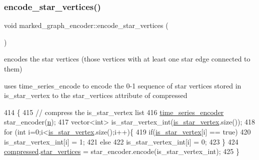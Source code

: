 \mbox{\label{classmarked__graph__encoder_af8daeed1452dbfd41fa2f875813e3496}} 
\subsubsection{\texorpdfstring{encode\+\_\+star\+\_\+vertices()}{encode\_star\_vertices()}}
{\footnotesize\ttfamily void marked\+\_\+graph\+\_\+encoder\+::encode\+\_\+star\+\_\+vertices (\begin{DoxyParamCaption}{ }\end{DoxyParamCaption})\hspace{0.3cm}{\ttfamily [private]}}



encodes the star vertices (those vertices with at least one star edge connected to them) 

uses time\+\_\+series\+\_\+encode to encode the 0-\/1 sequence of star vertices stored in is\+\_\+star\+\_\+vertex to the star\+\_\+vertices attribute of compressed 
\begin{DoxyCode}
414 \{
415   \textcolor{comment}{// compress the is\_star\_vertex list}
416   \hyperlink{classtime__series__encoder}{time\_series\_encoder} star\_encoder(\hyperlink{classmarked__graph__encoder_a4c66d9fdbc14c97523715aac7e4511cb}{n});
417   vector<int> is\_star\_vertex\_int(\hyperlink{classmarked__graph__encoder_ac36f6c2430af6fa4d20584569859bb59}{is\_star\_vertex}.size());
418   \textcolor{keywordflow}{for} (\textcolor{keywordtype}{int} i=0;i<\hyperlink{classmarked__graph__encoder_ac36f6c2430af6fa4d20584569859bb59}{is\_star\_vertex}.size();i++)\{
419     \textcolor{keywordflow}{if}(\hyperlink{classmarked__graph__encoder_ac36f6c2430af6fa4d20584569859bb59}{is\_star\_vertex}[i] == \textcolor{keyword}{true})
420       is\_star\_vertex\_int[i] = 1;
421     \textcolor{keywordflow}{else}
422       is\_star\_vertex\_int[i] = 0;
423   \}
424   \hyperlink{classmarked__graph__encoder_ac2ded200860fdd2321f86dd76b28bcb3}{compressed}.\hyperlink{classmarked__graph__compressed_a7a4ced4586e2e353f9076bd447df5208}{star\_vertices} = star\_encoder.encode(is\_star\_vertex\_int);
425 \}
\end{DoxyCode}
\mbox{\label{classmarked__graph__encoder_a239769085214166e09cb56de750a8d71}} 
